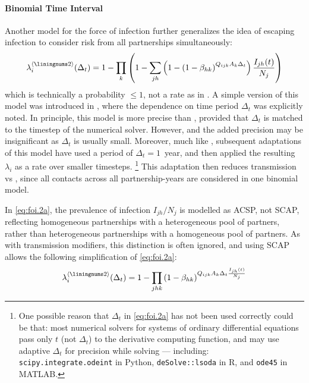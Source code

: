 \paragraph{ Binomial Time Interval}
Another model for the force of infection
further generalizes the idea of escaping infection to consider
risk from all partnerships simultaneously:
\begin{equation}\label{eq:foi.2a}
  \lambda_i^{\case{2}}(\Delta_t) =
  1 - \prod_{k}\left(1 - \sum_{jh} \left(1 -
  {\left(1 - \beta_{hk}\right)}^{Q_{ijk} A_k \Delta_t}\right) \frac{I_{jh}(t)}{N_j}\right)
\end{equation}
which is technically a probability $\le 1$, not a rate as in .
A simple version of this model was introduced in \cite{Auvert1990},
where the dependence on time period $\Delta_t$ was explicitly noted.
In principle, this model is more precise than ,
provided that $\Delta_t$ is matched to the timestep of the numerical solver.
However, and the added precision may be insignificant as $\Delta_t$ is usually small.
Moreover, much like , subsequent adaptations of this model have
used a period of $\Delta_t = 1$~year,
and then applied the resulting $\lambda_i$ as a rate over smaller timesteps.%
\footnote{One possible reason that $\Delta_t$ in \eqref{eq:foi.2a}
  has not been used correctly could be that:
  most numerical solvers for systems of ordinary differential equations
  pass only $t$ (not $\Delta_t$) to the derivative computing function,
  and may use adaptive $\Delta_t$ for precision while solving --- including:
  \texttt{scipy.integrate.odeint} in Python,
  \texttt{deSolve::lsoda} in R, and
  \texttt{ode45} in MATLAB.}
This adaptation then reduces transmission vs ,
since all contacts across all partnership-years
are considered in one binomial model.
\par
In \eqref{eq:foi.2a}, the prevalence of infection $I_{jh}/N_j$ is modelled as ACSP, not SCAP,
reflecting homogeneous partnerships with a heterogeneous pool of partners, rather than
heterogeneous partnerships with a homogeneous pool of partners.
As with transmission modifiers, this distinction is often ignored,
and using SCAP allows the following simplification of \eqref{eq:foi.2a}:%
\begin{equation}\label{eq:foi.2bi}
  \lambda_i^{\case{2}}(\Delta_t) =
  1 - \prod_{jhk}{\left(1 - \beta_{hk}\right)}^{Q_{ijk} A_k \Delta_t \frac{I_{jh}(t)}{N_j}}
\end{equation}
